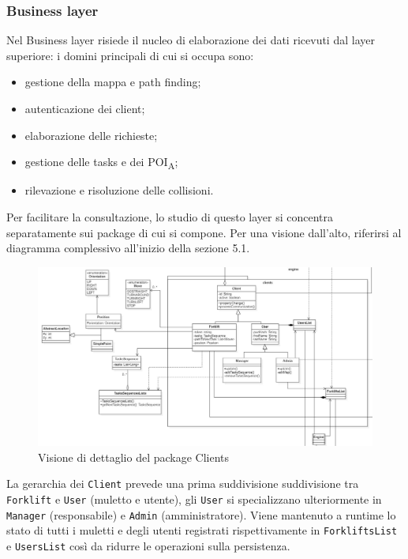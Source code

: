 \clearpage
\subsubsection{Business layer}

Nel Business layer risiede il nucleo di elaborazione dei dati ricevuti dal layer superiore: i domini principali di cui si occupa sono:
\begin{itemize}
	\item gestione della mappa e path finding;
	\item autenticazione dei client;
    \item elaborazione delle richieste;
	\item gestione delle tasks e dei POI\textsubscript{A};
	\item rilevazione e risoluzione delle collisioni.
\end{itemize}
Per facilitare la consultazione, lo studio di questo layer si concentra separatamente sui package di cui si compone. Per una visione dall'alto, riferirsi al diagramma complessivo all'inizio della sezione 5.1.



\clearpage
{}

\begin{figure}[H]
	\centering
	\includegraphics[scale=0.40]{res/diagrams/server/server_pack_clients.jpg}
	\caption{Visione di dettaglio del package Clients}
\end{figure}

La gerarchia dei \texttt{Client} prevede una prima suddivisione suddivisione tra \texttt{Forklift} e \texttt{User} (muletto e utente), gli \texttt{User} si specializzano ulteriormente in \texttt{Manager} (responsabile) e \texttt{Admin} (amministratore). Viene mantenuto a runtime lo stato di tutti i muletti e degli utenti registrati rispettivamente in \texttt{ForkliftsList} e \texttt{UsersList} così da ridurre le operazioni sulla persistenza.

